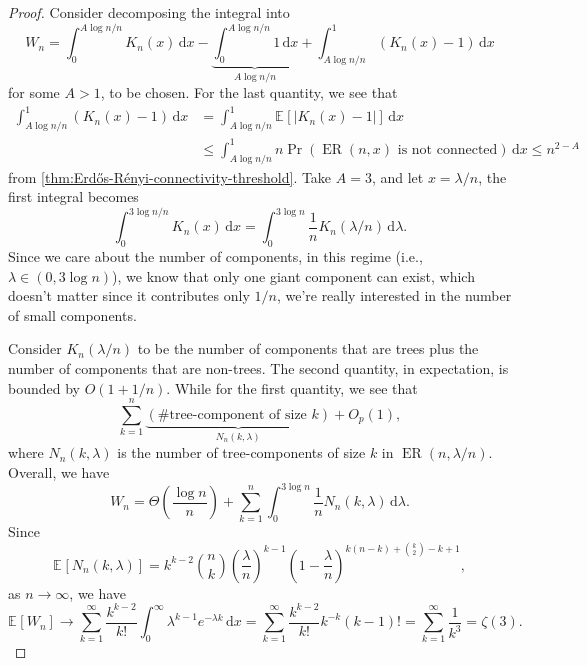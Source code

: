 \begin{proof}
	Consider decomposing the integral into
	\[
		W_n
		= \int_{0}^{A \log n / n} K_n(x) \,\mathrm{d}x
		- \underbrace{\int_{0}^{A \log n / n} 1 \,\mathrm{d}x}_{A \log n / n}
		+ \int_{A \log n / n}^{1} (K_n(x) - 1) \,\mathrm{d}x
	\]
	for some \(A > 1\), to be chosen. For the last quantity, we see that
	\[
		\begin{split}
			\int_{A \log n / n}^{1} (K_n(x) - 1) \,\mathrm{d}x
			 & = \int_{A \log n / n}^{1} \mathbb{E}_{}[\lvert K_n(x) - 1 \rvert ]  \,\mathrm{d}x                                  \\
			 & \leq \int_{A \log n / n}^{1} n \Pr_{}\left(\operatorname{ER}(n, x) \text{ is not connected} \right)  \,\mathrm{d}x
			\leq n^{2 - A}
		\end{split}
	\]
	from \autoref{thm:Erdős-Rényi-connectivity-threshold}. Take \(A = 3\), and let \(x = \lambda / n\), the first integral becomes
	\[
		\int_{0}^{3 \log n / n} K_n(x) \,\mathrm{d}x
		= \int_{0}^{3 \log n} \frac{1}{n} K_n(\lambda / n) \,\mathrm{d}\lambda .
	\]
	Since we care about the number of components, in this regime (i.e., \(\lambda \in (0, 3 \log n)\)), we know that only one giant component can exist, which doesn't matter since it contributes only \(1 / n\), we're really interested in the number of small components.

	Consider \(K_n(\lambda / n)\) to be the number of components that are trees plus the number of components that are non-trees. The second quantity, in expectation, is bounded by \(O(1+ 1 / n)\). While for the first quantity, we see that
	\[
		\sum_{k=1}^{n} \underbrace{( \text{\#tree-component of size \(k\)} )}_{N_n(k, \lambda )} + O_p(1),
	\]
	where \(N_n(k, \lambda )\) is the number of tree-components of size \(k\) in \(\operatorname{ER}(n, \lambda / n) \). Overall, we have
	\[
		W_n
		= \Theta \left( \frac{\log n}{n} \right) + \sum_{k=1}^{n} \int_{0}^{3 \log n} \frac{1}{n} N_n(k, \lambda ) \,\mathrm{d}\lambda.
	\]
	Since
	\[
		\mathbb{E}_{}[N_n(k, \lambda )]
		= k^{k-2} \binom{n}{k} \left( \frac{\lambda}{n} \right) ^{k-1} \left( 1 - \frac{\lambda}{n} \right) ^{k(n-k) + \binom{k}{2} - k + 1},
	\]
	as \(n \to \infty \), we have
	\[
		\mathbb{E}_{}[W_n]
		\to \sum_{k=1}^{\infty} \frac{k^{k-2}}{k!} \int_{0}^{\infty} \lambda ^{k-1} e^{-\lambda k} \,\mathrm{d}x
		= \sum_{k=1}^{\infty} \frac{k^{k-2}}{k!} k^{- k} (k-1)!
		= \sum_{k=1}^{\infty} \frac{1}{k^3}
		= \zeta (3).
	\]


\end{proof}
